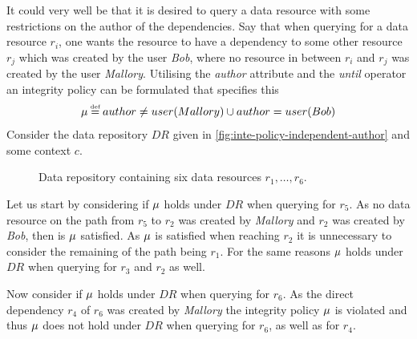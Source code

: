 \begin{example}
It could very well be that it is desired to query a data resource with some restrictions on the author of the dependencies. Say that when querying for a data resource $r_i$, one wants the resource to have a dependency to some other resource $r_j$ which was created by the user \emph{Bob}, where no resource in between $r_i$ and $r_j$ was created by the user \emph{Mallory}. Utilising the \emph{author} attribute and the \emph{until} operator an integrity policy can be formulated that specifies this
\begin{align*}
    \inte \eqdef author \neq user(Mallory) \U author = user(Bob)
\end{align*}
Consider the data repository $DR$ given in \autoref{fig:inte-policy-independent-author} and some context $c$.
\begin{figure}[!ht]
    \begin{center}
        
        \caption{Data repository containing six data resources $r_1, \ldots, r_6$.}
        \label{fig:inte-policy-independent-author}
    \end{center}
\end{figure}
Let us start by considering if $\mu$ holds under $DR$ when querying for $r_5$. As no data resource on the path from $r_5$ to $r_2$ was created by \emph{Mallory} and $r_2$ was created by \emph{Bob}, then is $\mu$ satisfied. As $\mu$ is satisfied when reaching $r_2$ it is unnecessary to consider the remaining of the path being $r_1$. For the same reasons $\mu$ holds under $DR$ when querying for $r_3$ and $r_2$ as well.

Now consider if $\mu$ holds under $DR$ when querying for $r_6$. As the direct dependency $r_4$ of $r_6$ was created by \emph{Mallory} the integrity policy $\mu$ is violated and thus $\mu$ does not hold under $DR$ when querying for $r_6$, as well as for $r_4$.
\end{example}

